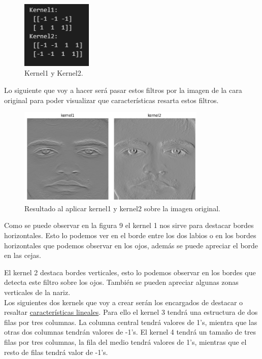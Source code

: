 \documentclass[a4paper]{article}
\begin{document}
\begin{figure}[h!]
    \centering
    \includegraphics[width=0.3\textwidth]{../img/k1k2.png}
    \caption{Kernel1 y Kernel2.}
\end{figure}

Lo siguiente que voy a hacer será pasar estos filtros por la imagen de la cara original para poder visualizar que características resarta estos filtros.

\begin{figure}[h!]
    \centering
    \includegraphics[width=0.80\textwidth]{../img/resultadok1k2.png}
    \caption{Resultado al aplicar kernel1 y kernel2 sobre la imagen original.}
\end{figure}

Como se puede observar en la figura 9 el kernel 1 nos sirve para destacar bordes horizontales.
Esto lo podemos ver en el borde entre los dos labios o en los bordes horizontales que podemos observar en los ojos, además se puede apreciar el borde en las cejas.

El kernel 2 destaca bordes verticales, esto lo podemos observar en los bordes que detecta este filtro sobre los ojos.
También se pueden apreciar algunas zonas verticales de la nariz.\\

Los siguientes dos kernels que voy a crear serán los encargados de destacar o resaltar \underline{características lineales}.
Para ello el kernel 3 tendrá una estructura de dos filas por tres columnas.
La columna central tendrá valores de 1's, mientra que las otras dos columnas tendrán valores de -1's.
El kernel 4 tendrá un tamaño de tres filas por tres columnas, la fila del medio tendrá valores de 1's, mientras que el resto de filas tendrá valor de -1's.
\end{document}
